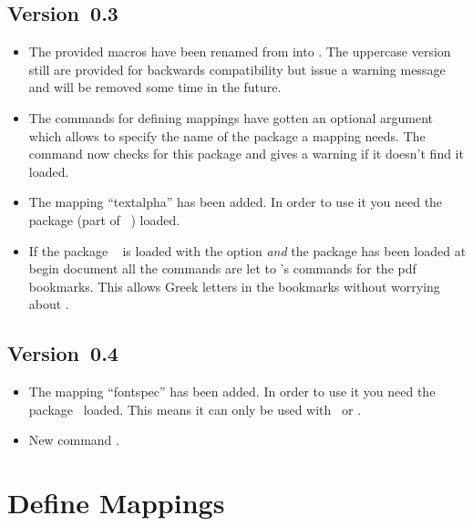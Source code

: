 \documentclass[load-preamble+]{cnltx-doc}
\begin{document}
\subsection{Version~0.3}
\begin{itemize}
  \item The provided macros have been renamed from 
    into .  The uppercase version still are provided
    for backwards compatibility but issue a warning message and will be
    removed some time in the future.
  \item The commands for defining mappings have gotten an optional argument
    which allows to specify the name of the package a mapping needs.  The
    command  now checks for this package and gives
    a warning if it doesn't find it loaded.
  \item The mapping ``textalpha'' has been added.  In order to use it you
    need the  package (part of
    ~\cite{bnd:greek-fontenc}) loaded.
  \item If the package ~\cite{pkg:hyperref} is loaded with the
     option \emph{and} the  package has been
    loaded at begin document all the  commands are let
    to 's  commands for the \acs{pdf}
    bookmarks.  This allows Greek letters in the bookmarks without worrying
    about .
\end{itemize}

\subsection{Version~0.4}
\begin{itemize}
  \item The mapping ``fontspec'' has been added.  In order to use it you
    need the  package~\cite{pkg:fontspec} loaded.  This means it
    can only be used with \LuaLaTeX\ or \XeLaTeX.
  \item New command .
\end{itemize}

\section{Define Mappings}
\end{document}
